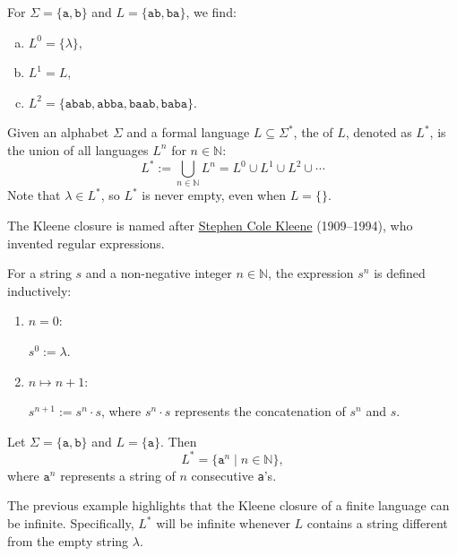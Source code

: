 \exampleEng
For $ \Sigma = \{ \texttt{a}, \texttt{b} \} $ and $ L = \{ \texttt{ab}, \texttt{ba} \} $, we find:
\begin{enumerate}[(a)]
\item $ L^0 = \{ \lambda \} $,
\item $ L^1 = L $,
\item $ L^2 = \{ \texttt{abab}, \texttt{abba}, \texttt{baab}, \texttt{baba} \} $. \eox
\end{enumerate}

\begin{Definition}
  Given an alphabet $ \Sigma $ and a formal language $ L \subseteq \Sigma^* $, the  of $ L $, denoted as $ L^* $, is the union of all languages $ L^n $ for $ n \in \mathbb{N} $:
  \[
  L^* := \bigcup_{n \in \mathbb{N}} L^n = L^0 \cup L^1 \cup L^2 \cup \cdots
  \]
  Note that $ \lambda \in L^* $, so $ L^* $ is never empty, even when $ L = \{\} $.

  The Kleene closure is named after \href{https://en.wikipedia.org/wiki/Stephen_Cole_Kleene}{Stephen Cole Kleene}
  (1909--1994), who invented regular expressions.
  \eox
\end{Definition}

\begin{Definition}
For a string $ s $ and a non-negative integer $ n \in \mathbb{N} $, the expression $ s^n $ is defined inductively:
\begin{enumerate}
\item[B.C.:] $ n = 0 $:

             $ s^0 := \lambda $.
\item[I.S.:] $ n \mapsto n + 1 $:

             $ s^{n+1} := s^n \cdot s $,  \quad where $ s^n \cdot s $ represents the concatenation of $ s^n $ and $ s $.
\eox
\end{enumerate}
\end{Definition}

\exampleEng
Let $ \Sigma = \{ \texttt{a}, \texttt{b} \} $ and $ L = \{ \texttt{a} \} $. Then
\[
L^* = \{ \texttt{a}^n \mid n \in \mathbb{N} \},
\]
where $ \texttt{a}^n $ represents a string of $ n $ consecutive \texttt{a}'s. \eox

The previous example highlights that the Kleene closure of a finite language can be infinite. Specifically,
$L^*$ will be infinite whenever $L$ contains a string different from the empty string $\lambda$.



